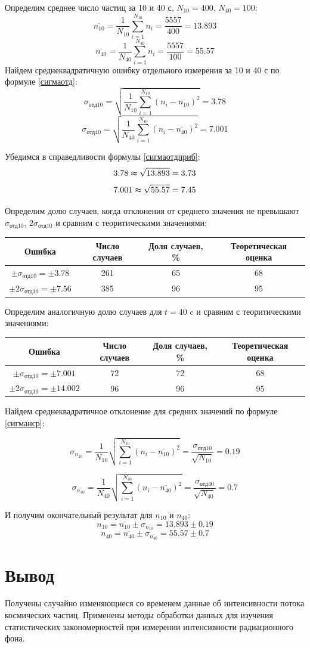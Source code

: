 \documentclass[a4paper,12pt]{article} %
\begin{document}
Определим среднее число частиц за 10 и 40 с, $N_{10}=400$, $N_{40}=100$:
\[\overline{n_{10}}=\frac{1}{N_{10}}\sum_{i=1}^{N_{10}} {n_i}=\frac{5557}{400}=13.893\]
\[\overline{n_{40}}=\frac{1}{N_{40}}\sum_{i=1}^{N_{40}} {n_i}=\frac{5557}{100}=55.57\]
Найдем среднеквадратичную ошибку отдельного измерения за 10 и 40 с по формуле \ref{сигмаотд}:
\[\sigma_{\text{отд10}}=\sqrt{\frac{1}{N_{10}}\sum_{i=1}^{N_{10}}{(n_i-\overline{n_{10}})^2}}=3.78\]
\[\sigma_{\text{отд40}}=\sqrt{\frac{1}{N_{40}}\sum_{i=1}^{N_{40}}{(n_i-\overline{n_{40}})^2}}=7.001\]

Убедимся в справедливости формулы \ref{сигмаотдприб}:
\[3.78\thickapprox\sqrt{13.893}=3.73\]
\[7.001\thickapprox\sqrt{55.57}=7.45\]

Определим долю случаев, когда отклонения от среднего значения не превышают $\sigma_{\text{отд10}}$, $2\sigma_{\text{отд10}}$ и сравним с теоритическими значениями:
\begin{table}
\begin{tabular}{|c|c|c|c|}
\hline 
Ошибка & Число случаев & Доля случаев, \% & Теоретическая оценка \\ 
\hline 
$\pm \sigma_{\text{отд10}}=\pm3.78$& 261 & 65 & 68 \\ 

$\pm 2\sigma_{\text{отд10}}=\pm7.56$ & 385 & 96 & 95 \\ 
\hline 
\end{tabular}
\end{table}
 
Определим аналогичную долю случаев для $t=\text{40 c}$ и сравним с теоритическими значениями:
\begin{table}
\begin{tabular}{|c|c|c|c|}
\hline 
Ошибка & Число случаев & Доля случаев, \% & Теоретическая оценка \\ 
\hline 
$\pm \sigma_{\text{отд10}}=\pm7.001$& 72 & 72 & 68 \\ 

$\pm 2\sigma_{\text{отд10}}=\pm14.002$ & 96 & 96 & 95 \\ 
\hline 
\end{tabular} 
\end{table}


Найдем среднеквадратичное отклонение для средних значений по формуле \ref{сигманср}:

\[\sigma_{\overline{n_{10}}}=\frac{1}{N_{10}}\sqrt{\sum_{i=1}^{N_{10}}{(n_i-\overline{n_{10}})^2}}=\frac{\sigma_{\text{отд10}}}{\sqrt{N_{10}}}=0.19\]

\[\sigma_{\overline{n_{40}}}=\frac{1}{N_{40}}\sqrt{\sum_{i=1}^{N_{40}}{(n_i-\overline{n_{40}})^2}}=\frac{\sigma_{\text{отд40}}}{\sqrt{N_{40}}}=0.7\]

И получим окончательный результат для $n_{10}$ и $n_{40}$:
\[n_{10}=\overline{n_{10}}\pm\sigma_{\overline{n_{10}}}=13.893\pm0.19\]
\[n_{40}=\overline{n_{40}}\pm\sigma_{\overline{n_{40}}}=55.57\pm0.7\]
\section{Вывод}
Получены случайно изменяющиеся со временем данные об интенсивности потока космических частиц. Применены методы обработки данных для изучения статистических закономерностей при измерении интенсивности радиационного фона.
\end{document}
